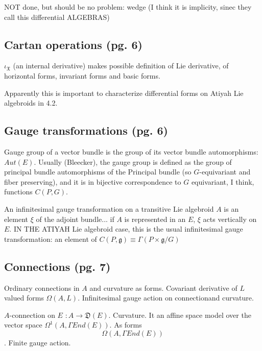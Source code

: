 \documentclass{article}
\begin{document}
NOT done, but should be no problem: wedge (I think it is implicity, sinec they call this differential ALGEBRAS)


\subsection{Cartan operations (pg. 6)}

$\iota_{\mathfrak X}$ (an internal derivative) makes possible definition of Lie derivative, of horizontal forms, invariant forms and basic forms.

Apparently this is important to characterize differential forms on Atiyah Lie algebroids in 4.2.

\subsection{Gauge transformations (pg. 6)}

Gauge group of a vector bundle is the group of its vector bundle automorphisms: $Aut(E)$. Usually (Bleecker), the gauge group is defined as the group of principal bundle automorphisms of the Principal bundle (so $G$-equivariant and fiber preserving), and it is in bijective correspondence to $G$ equivariant, I think, functions $C(P, G)$.

An infinitesimal gauge transformation on a transitive Lie algebroid $A$ is an element $\xi$ of the adjoint bundle... if $A$ is represented in an $E$, $\xi$ acts vertically on $E$. IN THE ATIYAH Lie algebroid case, this is the usual infinitesimal gauge transformation: an element of $C(P, \mathfrak g) \equiv \Gamma(P \times \mathfrak g/G)$

\subsection{Connections (pg. 7)}

Ordinary connections in $A$ and curvature as forms. Covariant derivative of $L$ valued forms $\Omega(A, L)$. Infinitesimal gauge action on connectionand curvature.

$A$-connection on $E$ $:A \to \mathfrak D(E)$. Curvature. It an affine space model over the vector space $\Omega^1(A, \Gamma End(E))$. As forms \[\Omega(A, \Gamma End(E))\]. Finite gauge action.
\end{document}
